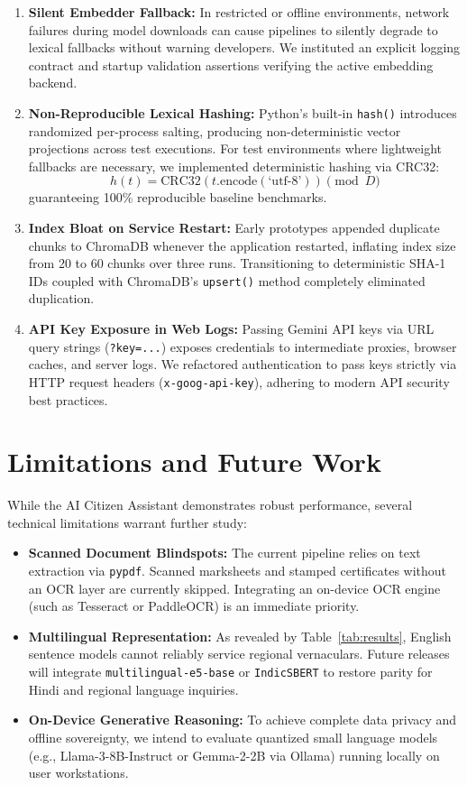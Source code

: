 \documentclass[conference]{IEEEtran}
\begin{document}
\begin{enumerate}
    \item \textbf{Silent Embedder Fallback:} In restricted or offline environments, network failures during model downloads can cause pipelines to silently degrade to lexical fallbacks without warning developers. We instituted an explicit logging contract and startup validation assertions verifying the active embedding backend.
    \item \textbf{Non-Reproducible Lexical Hashing:} Python's built-in \texttt{hash()} introduces randomized per-process salting, producing non-deterministic vector projections across test executions. For test environments where lightweight fallbacks are necessary, we implemented deterministic hashing via CRC32:
    \begin{equation}
    h(t) = \mathrm{CRC32}(t.\mathrm{encode}(\text{`utf-8'})) \pmod D
    \end{equation}
    guaranteeing 100\% reproducible baseline benchmarks.
    \item \textbf{Index Bloat on Service Restart:} Early prototypes appended duplicate chunks to ChromaDB whenever the application restarted, inflating index size from 20 to 60 chunks over three runs. Transitioning to deterministic SHA-1 IDs coupled with ChromaDB's \texttt{upsert()} method completely eliminated duplication.
    \item \textbf{API Key Exposure in Web Logs:} Passing Gemini API keys via URL query strings (\texttt{?key=...}) exposes credentials to intermediate proxies, browser caches, and server logs. We refactored authentication to pass keys strictly via HTTP request headers (\texttt{x-goog-api-key}), adhering to modern API security best practices.
\end{enumerate}

\section{Limitations and Future Work}
While the AI Citizen Assistant demonstrates robust performance, several technical limitations warrant further study:
\begin{itemize}
    \item \textbf{Scanned Document Blindspots:} The current pipeline relies on text extraction via \texttt{pypdf}. Scanned marksheets and stamped certificates without an OCR layer are currently skipped. Integrating an on-device OCR engine (such as Tesseract or PaddleOCR) is an immediate priority.
    \item \textbf{Multilingual Representation:} As revealed by Table~\ref{tab:results}, English sentence models cannot reliably service regional vernaculars. Future releases will integrate \texttt{multilingual-e5-base} or \texttt{IndicSBERT} to restore parity for Hindi and regional language inquiries.
    \item \textbf{On-Device Generative Reasoning:} To achieve complete data privacy and offline sovereignty, we intend to evaluate quantized small language models (e.g., Llama-3-8B-Instruct or Gemma-2-2B via Ollama) running locally on user workstations.
\end{itemize}
\end{document}
